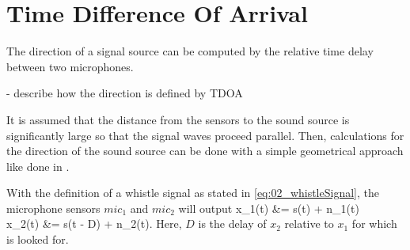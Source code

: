 \section{Time Difference Of Arrival}

The direction of a signal source can be computed by the relative time delay between
two microphones.

- describe how the direction is defined by TDOA

It is assumed that the distance from the sensors to the sound source is
significantly large so that the signal waves proceed parallel.
Then, calculations for the direction of the sound source can be done with a simple
geometrical approach like done in \cite{Valin_Michaud}.

With the definition of a whistle signal as stated in \ref{eq:02_whistleSignal},
the microphone sensors $mic_1$ and $mic_2$ will output
\bsub \bal
    x_1(t) &= s(t) + n_1(t)\\
    x_2(t) &= \alpha s(t - D) + n_2(t).
\eal \esub
\label{eq:02_signalTimeDomain}
Here, $D$ is the delay of $x_2$ relative to $x_1$ for which is looked for.